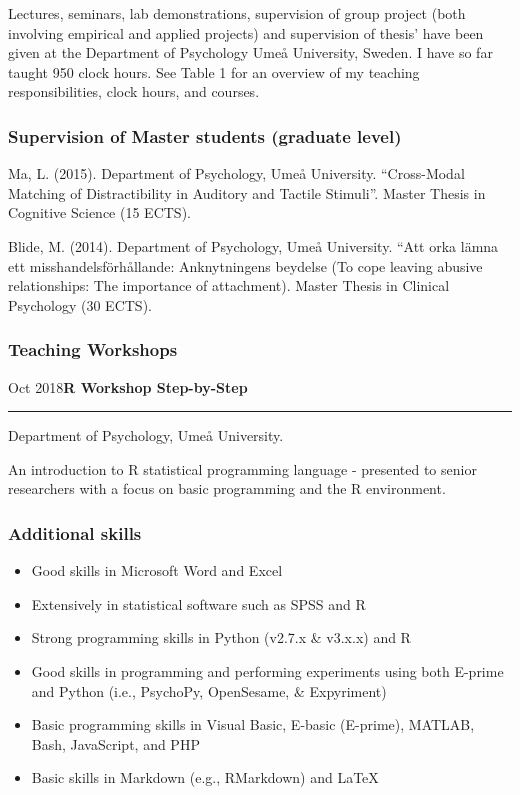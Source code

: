 \documentclass[]{article}
\providecommand{\tightlist}{%
  \setlength{\itemsep}{0pt}\setlength{\parskip}{0pt}}
\begin{document}
Lectures, seminars, lab demonstrations, supervision of group project
(both involving empirical and applied projects) and supervision of
thesis' have been given at the Department of Psychology Umeå University,
Sweden. I have so far taught 950 clock hours. See Table 1 for an
overview of my teaching responsibilities, clock hours, and courses.

\subsubsection{Supervision of Master students (graduate
level)}\label{supervision-of-master-students-graduate-level}

Ma, L. (2015). Department of Psychology, Umeå University. ``Cross-Modal
Matching of Distractibility in Auditory and Tactile Stimuli''. Master
Thesis in Cognitive Science (15 ECTS).

Blide, M. (2014). Department of Psychology, Umeå University. ``Att orka
lämna ett misshandelsförhållande: Anknytningens beydelse (To cope
leaving abusive relationships: The importance of attachment). Master
Thesis in Clinical Psychology (30 ECTS).

\subsubsection{Teaching Workshops}\label{teaching-workshops}

Oct 2018\hspace{0.75cm}\textbf{R Workshop Step-by-Step}

\hrule

\begin{changemargin}{2.15cm}{2.4cm}


Department of Psychology, Umeå University.

An introduction to R statistical programming language - presented to senior researchers with a focus on basic programming and the R environment.

\end{changemargin}

\subsubsection{Additional skills}\label{additional-skills}

\begin{itemize}
\tightlist
\item
  Good skills in Microsoft Word and Excel
\item
  Extensively in statistical software such as SPSS and R
\item
  Strong programming skills in Python (v2.7.x \& v3.x.x) and R
\item
  Good skills in programming and performing experiments using both
  E-prime and Python (i.e., PsychoPy, OpenSesame, \& Expyriment)
\item
  Basic programming skills in Visual Basic, E-basic (E-prime), MATLAB,
  Bash, JavaScript, and PHP
\item
  Basic skills in Markdown (e.g., RMarkdown) and \LaTeX
\end{itemize}
\end{document}

